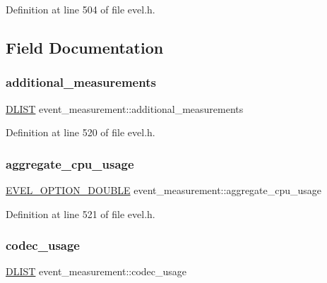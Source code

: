 Definition at line 504 of file evel.\+h.



\subsection{Field Documentation}
\hypertarget{structevent__measurement_a4d4fe325bb6a86a64951252656f75ea4}{}\label{structevent__measurement_a4d4fe325bb6a86a64951252656f75ea4} 
\subsubsection{\texorpdfstring{additional\+\_\+measurements}{additional\_measurements}}
{\footnotesize\ttfamily \hyperlink{double__list_8h_a45f4a129042d9e1aa4ffd31fe13e4d14}{D\+L\+I\+ST} event\+\_\+measurement\+::additional\+\_\+measurements}



Definition at line 520 of file evel.\+h.

\hypertarget{structevent__measurement_acf0f0c714e72b5fb6dc75939f4f58e61}{}\label{structevent__measurement_acf0f0c714e72b5fb6dc75939f4f58e61} 
\subsubsection{\texorpdfstring{aggregate\+\_\+cpu\+\_\+usage}{aggregate\_cpu\_usage}}
{\footnotesize\ttfamily \hyperlink{evel_8h_aafc42b3cd9aca88804c3d413e4ccec06}{E\+V\+E\+L\+\_\+\+O\+P\+T\+I\+O\+N\+\_\+\+D\+O\+U\+B\+LE} event\+\_\+measurement\+::aggregate\+\_\+cpu\+\_\+usage}



Definition at line 521 of file evel.\+h.

\hypertarget{structevent__measurement_a9ef619061bb0185c063ede94a114a73c}{}\label{structevent__measurement_a9ef619061bb0185c063ede94a114a73c} 
\subsubsection{\texorpdfstring{codec\+\_\+usage}{codec\_usage}}
{\footnotesize\ttfamily \hyperlink{double__list_8h_a45f4a129042d9e1aa4ffd31fe13e4d14}{D\+L\+I\+ST} event\+\_\+measurement\+::codec\+\_\+usage}




